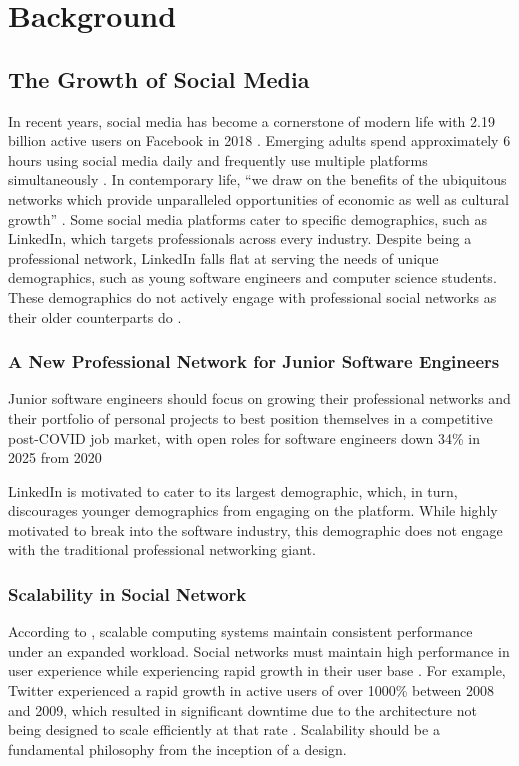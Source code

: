 \chapter{Background}
\label{cha:background}

\section{The Growth of Social Media}
In recent years, social media has become a cornerstone of modern life with 2.19 billion active users on Facebook in 2018 \citep{saha2019impact}. Emerging adults spend approximately 6 hours using social media daily and frequently use multiple platforms simultaneously \citep{vannucci2019use}.
In contemporary life, ``we draw on the benefits of the ubiquitous networks which provide unparalleled opportunities of economic as well as cultural growth'' \citep{hruska2020use}.
Some social media platforms cater to specific demographics, such as LinkedIn, which targets professionals across every industry.
Despite being a professional network, LinkedIn falls flat at serving the needs of unique demographics, such as young software engineers and computer science students.
These demographics do not actively engage with professional social networks as their older counterparts do \citep{florenthal2012college}. 

\subsection{A New Professional Network for Junior Software Engineers}
Junior software engineers should focus on growing their professional networks and their portfolio of personal projects to best position themselves in a competitive post-COVID job market, with open roles for software engineers down 34\% in 2025 from 2020 \citep{fredsoftware2025}

LinkedIn is motivated to cater to its largest demographic, which, in turn, discourages younger demographics from engaging on the platform.
While highly motivated to break into the software industry, this demographic does not engage with the traditional professional networking giant.

\subsection{Scalability in Social Network}
According to \citeauthor{chippa2010scalable}, scalable computing systems maintain consistent performance under an expanded workload.
Social networks must maintain high performance in user experience while experiencing rapid growth in their user base \citep{pujol2010little}.
For example, Twitter experienced a rapid growth in active users of over 1000\% between 2008 and 2009, which resulted in significant downtime due to the architecture not being designed to scale efficiently at that rate \citep{sakaki2010earthquake}.
Scalability should be a fundamental philosophy from the inception of a design.

